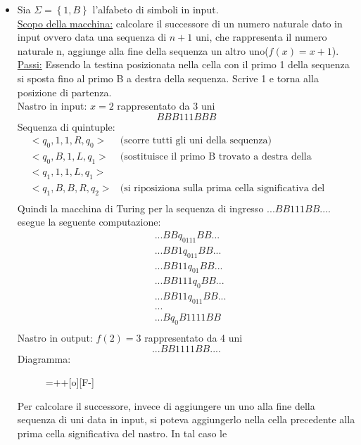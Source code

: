 \begin{itemize}
\item Sia $\Sigma=\left\{1,B\right\}$ l'alfabeto di simboli in
  input. \\\underline{Scopo della macchina:} calcolare il successore
  di un numero naturale dato in input ovvero data una sequenza di
  $n+1$ uni, che rappresenta il numero naturale n, aggiunge alla fine
  della sequenza un altro uno($f(x)=x+1$).\\\underline{Passi:} Essendo
  la testina posizionata nella cella con il primo 1 della sequenza si
  sposta fino al primo B a destra della sequenza. Scrive 1 e torna
  alla posizione di partenza.\\ Nastro in input: $x=2$ rappresentato
  da 3 uni $$BBB111BBB$$ Sequenza di quintuple:
\begin{eqnarray*}
&<q_0,1,1,R,q_0>&\mbox{(scorre tutti gli uni della sequenza)}\\
&<q_0,B,1,L,q_1>&\mbox{(sostituisce il primo B trovato a destra della sequenza con un 1)}\\
&<q_1,1,1,L,q_1>&\\
&<q_1,B,B,R,q_{2}>&\mbox{(si riposiziona sulla prima cella significativa del nastro)}\\
\end{eqnarray*}
Quindi la macchina di Turing per la sequenza di ingresso
$...BB111BB....$ esegue la seguente computazione:
\begin{eqnarray*}
&...BBq_0111BB...\\
&...BB1q_011BB...\\
&...BB11q_01BB...\\
&...BB111q_0BB...\\
&...BB11q_011BB...\\
&...\\
&...Bq_0B1111BB\\
\end{eqnarray*}
Nastro in output: $f(2)=3$ rappresentato da 4 uni $$...BB1111BB....$$
Diagramma:
\begin{figure}[hbtp!]
\hspace{3 cm} \entrymodifiers={++[o][F-]} \\
\end{figure}
\begin{oss}
Per calcolare il successore, invece di aggiungere un uno alla fine
della sequenza di uni data in input, si poteva aggiungerlo nella cella
precedente alla prima cella significativa del nastro. In tal caso le

\end{oss}
\end{itemize}
